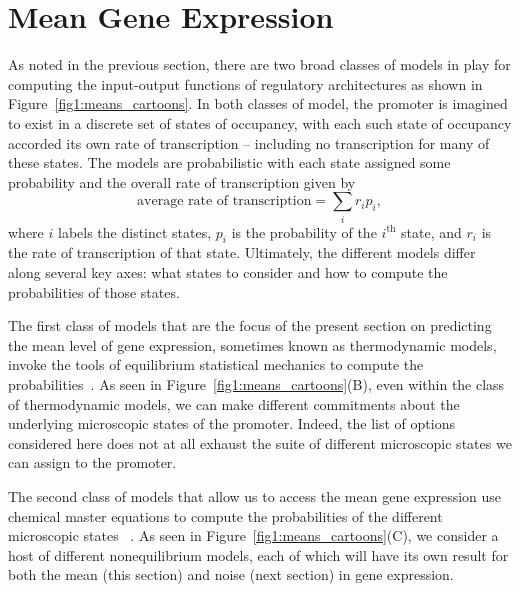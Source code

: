 \section{Mean Gene Expression}\label{section_02_means}

As noted in the previous section, there are two broad classes of models in play
for computing the input-output functions of regulatory architectures as shown in
Figure~\ref{fig1:means_cartoons}. In both classes of model, the promoter is
imagined to exist in a discrete set of states of occupancy, with each such state
of occupancy accorded its own rate of transcription -- including no 
transcription for many of these states. The models are probabilistic with each
state assigned some probability and the overall rate of transcription given by 
\begin{equation}
\mbox{average rate of transcription} = \sum_i r_i p_i,
\end{equation}
where $i$ labels the distinct states, $p_i$ is the probability of the
$i^{\text{th}}$ state, and $r_i$ is the rate of transcription of that state.
Ultimately, the different models differ along several key axes: what states to
consider and how to compute the probabilities of those states.

The first class of models that are the focus of the present section on
predicting the mean level of gene expression, sometimes known as thermodynamic
models, invoke the tools of equilibrium statistical mechanics to compute the
probabilities~\cite{Ackers1982, Shea1985, Buchler2003, Vilar2003a, Vilar2003b,
Bintu2005a, Bintu2005c, Gertz2009, Sherman2012, Saiz2013}. As seen in
Figure~\ref{fig1:means_cartoons}(B), even within the class of thermodynamic
models, we can make different commitments about the underlying microscopic
states of the promoter.  Indeed, the list of options considered here does not at
all exhaust the suite of different microscopic states we can assign to the
promoter.

The second class of models that allow us to access the mean gene expression use
chemical master equations to compute the probabilities of the different
microscopic states ~\cite{Ko1991, Peccoud1995, Record1996, Kepler2001,
Sanchez2008, Shahrezaei2008, Sanchez2011, Michel2010}. As seen in
Figure~\ref{fig1:means_cartoons}(C), we consider a host of different
nonequilibrium models, each of which will have its own result for both the mean
(this section) and noise (next section) in gene expression.


